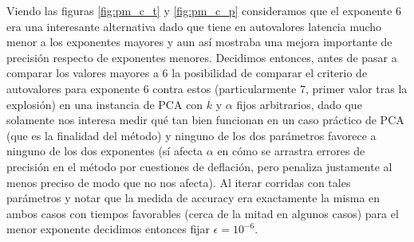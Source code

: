 Viendo las figuras \ref{fig:pm_c_t} y \ref{fig:pm_c_p} consideramos que el exponente $6$ era una interesante alternativa dado que tiene en autovalores latencia mucho menor a los exponentes mayores y aun así mostraba una mejora importante de precisión respecto de exponentes menores. Decidimos entonces, antes de pasar a comparar los valores mayores a $6$ la posibilidad de comparar el criterio de autovalores para exponente $6$ contra estos (particularmente $7$, primer valor tras la explosión) en una instancia de PCA con $k$ y $\alpha$ fijos arbitrarios, dado que solamente nos interesa medir qué tan bien funcionan en un caso práctico de PCA (que es la finalidad del método) y ninguno de los dos parámetros favorece a ninguno de los dos exponentes (sí afecta $\alpha$ en cómo se arrastra errores de precisión en el método por cuestiones de deflación, pero penaliza justamente al menos preciso de modo que no nos afecta). Al iterar corridas con tales parámetros y notar que la medida de accuracy era exactamente la misma en ambos casos con tiempos favorables (cerca de la mitad en algunos casos) para el menor exponente decidimos entonces fijar $\epsilon=10^{-6}$.
